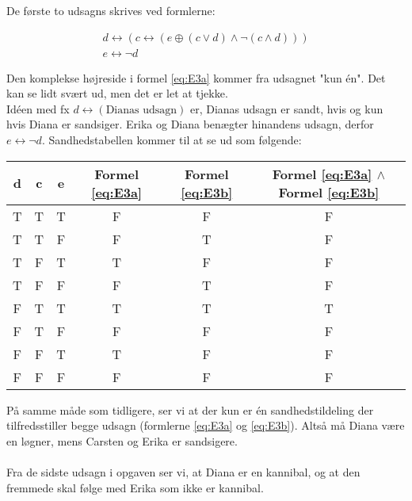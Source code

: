 De første to udsagns skrives ved formlerne: 

\begin{gather}
    d \leftrightarrow ( c \leftrightarrow ( e \oplus (c \vee d) \wedge \neg (c \wedge d))) \label{eq:E3a} \\ 
    e \leftrightarrow \neg d  \label{eq:E3b}
\end{gather} 

Den komplekse højreside i formel \eqref{eq:E3a} kommer fra udsagnet "kun én". Det kan se lidt svært ud, men det er let at tjekke. \\
Idéen med fx $d \leftrightarrow (\text{Dianas udsagn})$ er, Dianas udsagn er sandt, hvis og kun hvis Diana er sandsiger. Erika og Diana benægter hinandens udsagn, derfor $e \leftrightarrow \neg d$. Sandhedstabellen kommer til at se ud som følgende:

\begin{table}[H]
\centering
\begin{tabular}{c|c|c|c|c|c}
d & c & e & Formel \eqref{eq:E3a} & Formel \eqref{eq:E3b} & Formel \eqref{eq:E3a} $\wedge$ Formel \eqref{eq:E3b}\\ \hline
T & T & T & F      & F  & F \\
T & T & F & F      & T  & F\\
T & F & T & T      & F  & F   \\
T & F & F & F      & T  & F    \\
F & T & T & T      & T  & T    \\
F & T & F & F      & F  & F    \\
F & F & T & T      & F  & F    \\
F & F & F & F      & F  & F   
\end{tabular}
\end{table}

På samme måde som tidligere, ser vi at der kun er én sandhedstildeling der tilfredsstiller begge udsagn (formlerne \eqref{eq:E3a} og \eqref{eq:E3b}). Altså må Diana være en løgner, mens Carsten og Erika er sandsigere.\\
\\
Fra de sidste udsagn i opgaven ser vi, at Diana er en kannibal, og at den fremmede skal følge med Erika som ikke er kannibal.